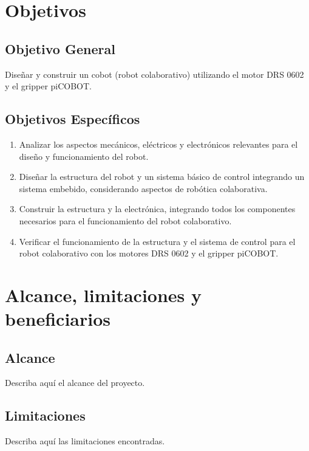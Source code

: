 \section{Objetivos}

\subsection{Objetivo General}

Diseñar y construir un cobot (robot colaborativo) utilizando el motor DRS 0602 y el gripper piCOBOT.

\subsection{Objetivos Específicos}

\begin{enumerate}
  \item Analizar los aspectos mecánicos, eléctricos y electrónicos relevantes para el diseño y funcionamiento del robot.
  \item Diseñar la estructura del robot y un sistema básico de control integrando un sistema embebido, considerando aspectos de robótica colaborativa.
  \item Construir la estructura y la electrónica, integrando todos los componentes necesarios para el funcionamiento del robot colaborativo.
  \item Verificar el funcionamiento de la estructura y el sistema de control para el robot colaborativo con los motores DRS 0602 y el gripper piCOBOT.
\end{enumerate}

\section{Alcance, limitaciones y beneficiarios}

\subsection{Alcance}

Describa aquí el alcance del proyecto.

\subsection{Limitaciones}

Describa aquí las limitaciones encontradas.

